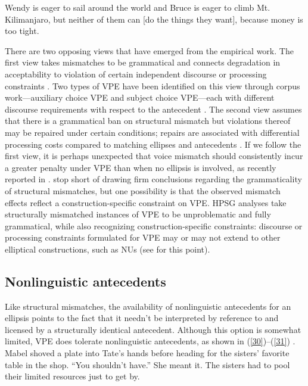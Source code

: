 \documentclass[output=paper
                ,modfonts
                ,nonflat
	        ,collection
	        ,collectionchapter
	        ,collectiontoclongg
 	        ,biblatex
                ,babelshorthands
                ,newtxmath
                ,draftmode
                ,colorlinks, citecolor=brown
]{./langsci/langscibook}
\begin{document}
{\ea Wendy is eager to sail around the world and Bruce is eager to climb Mt. Kilimanjaro, but neither of them can [do the things they want], because money is too tight. \citep{Webber79a} \label{29}\z

There are two opposing views that have emerged from the empirical work. The first view takes mismatches to be grammatical and connects degradation in acceptability to violation of certain independent discourse \citep{Kehler2002, Miller2011, %
Miller2014a, Miller2014b} or processing constraints \citep{Kim2011}. Two types of VPE have been identified on this view through corpus work---auxiliary choice VPE and subject choice VPE---each with different discourse requirements with respect to the antecedent \citep{Miller2011, Miller2014a, Miller2014b}. The second view assumes that there is a grammatical ban on structural mismatch but violations thereof may be repaired under certain conditions; repairs are associated with differential processing costs compared to matching ellipses and antecedents \citep{Arregui2006, Grant2012}. If we follow the first view, it is perhaps unexpected that voice mismatch should consistently incur a greater penalty under VPE than when no ellipsis is involved, as recently reported in \citet{Kim2015}. \citet{Kim2015} stop short of drawing firm conclusions regarding the grammaticality of structural mismatches, but one possibility is that the observed mismatch effects reflect a construction-specific constraint on VPE. HPSG analyses take structurally mismatched instances of VPE to be unproblematic and fully grammatical, while also recognizing construction-specific constraints: discourse or processing constraints formulated for VPE may or may not extend to other elliptical constructions, such as NUs (see \citealt{Ginzburg2018} for this point).


\subsection{Nonlinguistic antecedents}
Like structural mismatches, the availability of nonlinguistic antecedents for an ellipsis points to the fact that it needn't be interpreted by reference to and licensed by a structurally identical antecedent. Although this option is somewhat limited, VPE does tolerate nonlinguistic antecedents, as shown in (\ref{30})--(\ref{31}) \citep[see also][]{Hankamer1976, Schlachter1977}.
\ea Mabel shoved a plate into Tate's hands before heading for the sisters' favorite table in the shop. ``You shouldn't have.'' She meant it. The sisters had to pool their limited resources
just to get by. \citep[ex. 23][]{Miller2014b}\label{30}\z

}
\end{document}

